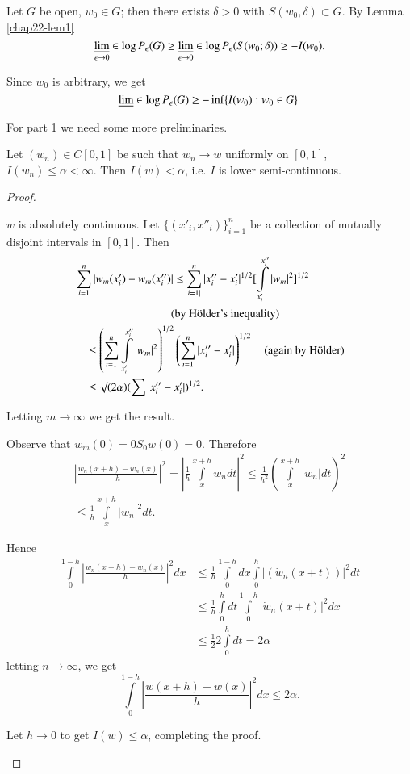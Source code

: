 Let $G$ be open, $w_{0}\in G$; then there exists $\delta>0$ with
$S(w_{0},\delta)\subset G$. By Lemma \ref{chap22-lem1}
$$
\varliminf\limits_{\epsilon\to 0}\in \log P_{\epsilon}(G)\geq
\varliminf\limits_{\epsilon\to 0}\in \log
P_{\epsilon}(S(w_{0};\delta))\geq -I(w_{0}).
$$

Since $w_{0}$ is arbitrary, we get
$$
\varliminf \in \log P_{\epsilon}(G)\geq -\inf \{I(w_{0}):w_{0}\in G\}.
$$

For part 1 we need some more preliminaries.

\begin{lemma}\label{chap22-lem2}
Let $(w_{n})\in C[0,1]$ be such that $w_{n}\to w$ uniformly on
$[0,1]$, $I(w_{n})\leq \alpha< \infty$. Then $I(w)<\alpha$, i.e. $I$
is lower semi-continuous.
\end{lemma}

\begin{proof}
\setcounter{step}{0}
\begin{step}%
$w$ is absolutely continuous. Let $\{(x'_{i},x''_{i})\}^{n}_{i=1}$ be
  a collection of mutually disjoint intervals in $[0,1]$. Then
\begin{align*}
&\sum^{n}_{i=1}|w_{m}(x'_{i})-w_{m}(x''_{i})|\leq
\sum\limits^{n}_{i=1|}|x''_{i}-x'_{i}|^{1/2}[\int\limits^{x''_{i}}_{x'_{i}}|w_{m}|^{2}]^{1/2}\\
&\hspace{3cm} \text{(by H\"older's inequality)}\\
&\q \leq
\left(\sum\limits^{n}_{i=1}\int\limits^{x''_{i}}_{x'_{i}}|w_{m}|^{2}\right)^{1/2}\left(\sum\limits^{n}_{i=1}|x''_{i}-x'_{i}|\right)^{1/2}\q\text{(again
  by H\"older)}\\
&\q \leq \surd(2\alpha)(\sum |x''_{i}-x'_{i}|)^{1/2}.
\end{align*}\pageoriginale

Letting $m\to \infty$ we get the result.
\end{step}

\begin{step}%
Observe that $w_{m}(0)=0S_{0}w(0)=0$. Therefore
\begin{gather*}
|\frac{w_{n}(x+h)-w_{n}(x)}{h}|^{2}=|\frac{1}{h}\int\limits^{x+h}_{x}w_{n}dt|^{2}\leq
\frac{1}{h^{2}}\left(\int\limits^{x+h}_{x}|w_{n}|dt\right)^{2}\\
\leq \frac{1}{h}\int\limits^{x+h}_{x}|w_{n}|^{2}dt.
\end{gather*}

Hence
\begin{align*}
\int\limits^{1-h}_{0}|\frac{w_{n}(x+h)-w_{n}(x)}{h}|^{2}dx
&\leq
\frac{1}{h}\int\limits^{1-h}_{0}dx\int\limits^{h}_{0}|(\dot{w}_{n}(x+t))|^{2}dt\\ 
&\leq
\frac{1}{h}\int\limits^{h}_{0}dt\int\limits^{1-h}_{0}|\dot{w}_{n}(x+t)|^{2}dx\\ 
&\leq \frac{1}{2}2\int\limits^{h}_{0}dt=2\alpha
\end{align*}
letting $n\to \infty$, we get
$$
\int\limits^{1-h}_{0}|\frac{w(x+h)-w(x)}{h}|^{2}dx\leq 2\alpha.
$$

Let $h\to 0$ to get $I(w)\leq \alpha$, completing the proof.
\end{step}
\end{proof}

